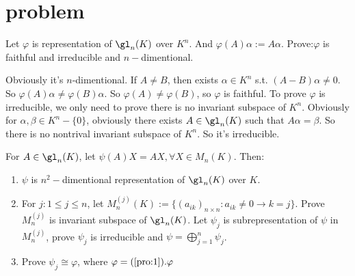 \documentclass{ctexart}
\newif\ifpreface
\renewcommand{\phi}{\varphi}
\begin{document}
\large
\setlength{\baselineskip}{1.2em}
\ifpreface
  
  \newgeometry{left=2cm,right=2cm,top=2cm,bottom=2cm}
\else
{}
\maketitle
\fi
\section{problem}
\begin{problem}\label{pro:1}
 Let $\phi$ is representation of $\gl_n(K)$ over $K^n$. And $\phi(A)\alpha:=A \alpha$. Prove:$\phi$ is faithful and irreducible and $n-$dimentional. 
\end{problem}
\begin{solution}
 Obviously it's $n$-dimentional. If $A\neq B$, then exists $\alpha\in K^n$ s.t. $(A-B)\alpha\neq 0$. So $\phi(A)\alpha\neq \phi(B)\alpha$. So $\phi(A)\neq \phi(B)$, so $\phi$ is faithful. To prove $\phi$ is irreducible, we only need to prove there is no invariant subspace of $K^n$. Obviously for $\alpha,\beta\in K^n\minus\{0\}$, obviously there exists $A\in \gl_n(K)$ such that $A \alpha=\beta$. So there is no nontrival invariant subspace of $K^n$. So it's irreducible. 
\end{solution}

\begin{problem}
 For $A\in\gl_n(K)$, let $\psi(A)X=AX,\forall X\in M_n(K)$. Then:
 \begin{enumerate}
  \item $\psi$ is $n^2-$dimentional representation of $\gl_n(K)$ over $K$. 
  \item For $j:1\leq j\leq n$, let $M_n^{(j)}(K):=\{(a_{ik})_{n\times n}:a_{ik}\neq 0\to k=j\}$. Prove $M_n^{(j)}$ is invariant subspace of $\gl_n(K)$. Let $\psi_j$ is subrepresentation of $\psi$ in $M_n^{(j)}$, prove $\psi_j$ is irreducible and $\psi=\bigoplus_{j=1}^n \psi_j$. 
  \item\label{it:1.3} Prove $\psi_j\cong \phi$, where $\phi=(\Cref{pro:1}).\phi$
 \end{enumerate}
\end{problem}
\end{document}
